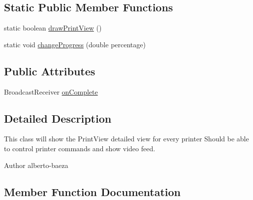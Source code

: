 \subsection*{Static Public Member Functions}
\begin{DoxyCompactItemize}
\item 
static boolean \hyperlink{classandroid_1_1app_1_1printerapp_1_1devices_1_1printview_1_1_print_view_fragment_acc340d44a0e640837dbc0fd0f386dff9}{draw\+Print\+View} ()
\item 
static void \hyperlink{classandroid_1_1app_1_1printerapp_1_1devices_1_1printview_1_1_print_view_fragment_a4bfa647e3a5371ebca8de2bf8e8fb8fc}{change\+Progress} (double percentage)
\end{DoxyCompactItemize}
\subsection*{Public Attributes}
\begin{DoxyCompactItemize}
\item 
Broadcast\+Receiver \hyperlink{classandroid_1_1app_1_1printerapp_1_1devices_1_1printview_1_1_print_view_fragment_a4b21940cd18f50e1d1e186e8214f3bac}{on\+Complete}
\end{DoxyCompactItemize}


\subsection{Detailed Description}
This class will show the Print\+View detailed view for every printer Should be able to control printer commands and show video feed.

\begin{DoxyAuthor}{Author}
alberto-\/baeza 
\end{DoxyAuthor}


\subsection{Member Function Documentation}
\mbox{\label{classandroid_1_1app_1_1printerapp_1_1devices_1_1printview_1_1_print_view_fragment_a4bfa647e3a5371ebca8de2bf8e8fb8fc}} 
